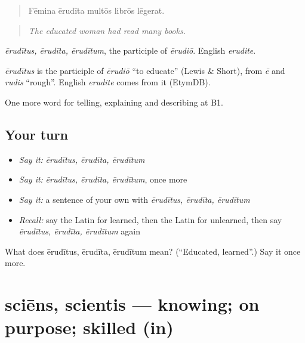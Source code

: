 \begin{quote}
Fēmina ērudīta multōs librōs lēgerat.
\end{quote}

\begin{quote}
\emph{The educated woman had read many books.}
\end{quote}

\emph{ērudītus, ērudīta, ērudītum}, the participle of \emph{ērudiō}. English \emph{erudite}.

\begin{cousinweb}
\emph{ērudītus} is the participle of \emph{ērudiō} \textquotedblleft{}to educate\textquotedblright{} (Lewis \& Short), from \emph{ē} and \emph{rudis} \textquotedblleft{}rough\textquotedblright{}. English \emph{erudite} comes from it (EtymDB).
\end{cousinweb}

\begin{grammarlens}[title={What you've built}]
One more word for telling, explaining and describing at B1.
\end{grammarlens}

\subsection*{Your turn}
\begin{itemize}
\raggedright
  \item \emph{Say it:} \emph{ērudītus, ērudīta, ērudītum}
  \item \emph{Say it:} \emph{ērudītus, ērudīta, ērudītum}, once more
  \item \emph{Say it:} a sentence of your own with \emph{ērudītus, ērudīta, ērudītum}
  \item \emph{Recall:} say the Latin for learned, then the Latin for unlearned, then say \emph{ērudītus, ērudīta, ērudītum} again
\end{itemize}

\begin{tcolorbox}[breakable,colback=teal!4,colframe=teal!35!black,title={Before you move on}]
What does ērudītus, ērudīta, ērudītum mean? (\textquotedblleft{}Educated, learned\textquotedblright{}.) Say it once more.
\end{tcolorbox}
\section[sciēns, scientis]{sciēns, scientis — knowing; on purpose; skilled (in)}

